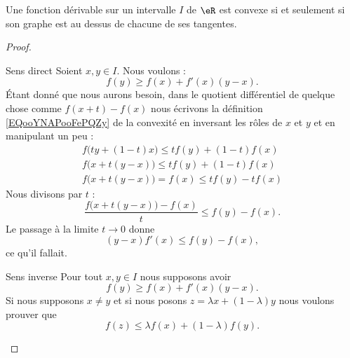 \begin{proposition} \label{PROPooQPOSooDZlUAJ}
    Une fonction dérivable sur un intervalle \( I\) de \( \eR\) est convexe si et seulement si son graphe est au dessus de chacune de ses tangentes.
\end{proposition}

\begin{proof}
    \begin{subproof}
        \item[Sens direct]
            Soient \( x,y\in I\). Nous voulons :
            \begin{equation}
                f(y)\geq f(x)+f'(x)(y-x).
            \end{equation}
            Étant donné que nous aurons besoin, dans le quotient différentiel de quelque chose comme \( f(x+t)-f(x)\) nous écrivons la définition \eqref{EQooYNAPooFePQZy} de la convexité en inversant les rôles de \( x\) et \( y\) et en manipulant un peu :
            \begin{subequations}
                \begin{align}
                    f\big( ty+(1-t)x \big)\leq tf(y)+(1-t)f(x)\\
                    f\big( x+t(y-x) \big)\leq tf(y)+(1-t)f(x)\\
                    f\big(  x+t(y-x)  \big)=f(x)\leq tf(y)-tf(x)
                \end{align}
            \end{subequations}
            Nous divisons par \( t\) :
            \begin{equation}
                \frac{ f\big( x+t(y-x) \big)-f(x) }{ t }\leq f(y)-f(x).
            \end{equation}
            Le passage à la limite \( t\to 0\) donne
            \begin{equation}
                (y-x)f'(x)\leq f(y)-f(x),
            \end{equation}
            ce qu'il fallait.
        \item[Sens inverse]
            Pour tout \( x,y\in I\) nous supposons avoir
            \begin{equation}        \label{EQooEXXIooHXJnER}
                f(y)\geq f(x)+f'(x)(y-x).
            \end{equation}
            Si nous supposons \( x\neq y\) et si nous posons \( z=\lambda x+(1-\lambda)y\) nous voulons prouver que
            \begin{equation}
                f(z)\leq \lambda f(x)+(1-\lambda)f(y).

\end{equation}
\end{subproof}
\end{proof}
